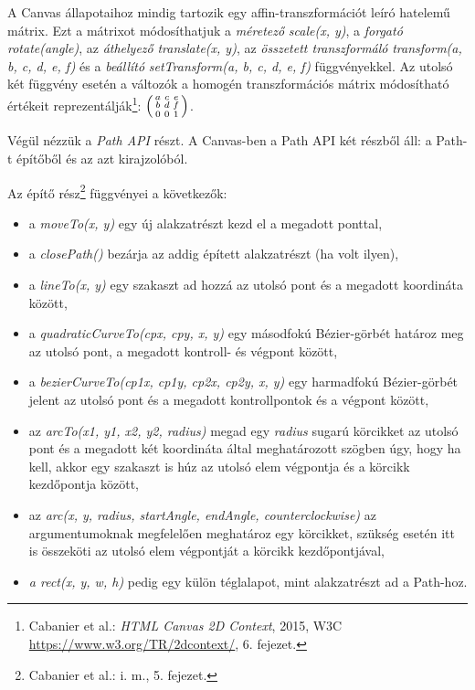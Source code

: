 \documentclass[12pt]{report}
\theoremstyle{definition}
\newcommand{\func}[1]{{\textsl{#1}}}
\begin{document}
A Canvas állapotaihoz mindig tartozik egy affin-transzformációt leíró hatelemű
mátrix. Ezt a mátrixot módosíthatjuk a \emph{méretező} \func{scale(x, y)}, a
\emph{forgató} \func{rotate(angle)}, az \emph{áthelyező} \func{translate(x,
y)}, az \emph{összetett transzformáló} \func{transform(a, b, c, d, e, f)} és a
\emph{beállító} \func{setTransform(a, b, c, d, e, f)} függvényekkel. Az utolsó
két függvény esetén a változók a homogén transzformációs mátrix módosítható
értékeit reprezentálják\footnote{Cabanier et al.: \emph{{HTML} Canvas {2D}
Context}, 2015, W3C\\ {\footnotesize\url{https://www.w3.org/TR/2dcontext/}}, 6.
fejezet.}: ${\Bigl(\begin{smallmatrix}a & c & e \\ b & d & f \\ 0 & 0 & 1 \\
\end{smallmatrix}\Bigr)}$.

Végül nézzük a \emph{Path API} részt. A Canvas-ben a Path API két részből áll:
a Path-t építőből és az azt kirajzolóból.

Az építő rész\footnote{Cabanier et al.: i. m., 5. fejezet.} függvényei a
következők:
\begin{itemize}
  \item a \func{moveTo(x, y)} egy új alakzatrészt kezd el a megadott ponttal,
  \item a \func{closePath()} bezárja az addig épített alakzatrészt (ha volt
  ilyen),
  \item a \func{lineTo(x, y)} egy szakaszt ad hozzá az utolsó pont és a
  megadott koordináta között,
  \item a \func{quadraticCurveTo(cpx, cpy, x, y)} egy másodfokú Bézier-görbét
  határoz meg az utolsó pont, a megadott kontroll- és végpont között,
  \item a \func{bezierCurveTo(cp1x, cp1y, cp2x, cp2y, x, y)} egy harmadfokú
  Bézier-görbét jelent az utolsó pont és a megadott kontrollpontok és a végpont
  között,
  \item az \func{arcTo(x1, y1, x2, y2, radius)} megad egy \func{radius} sugarú
  körcikket az utolsó pont és a megadott két koordináta által meghatározott
  szögben úgy, hogy ha kell, akkor egy szakaszt is húz az utolsó elem végpontja
  és a körcikk kezdőpontja között,
  \item az \func{arc(x, y, radius, startAngle, endAngle, counterclockwise)} az
  argumentumoknak megfelelően meghatároz egy körcikket, szükség esetén itt is
  összeköti az utolsó elem végpontját a körcikk kezdőpontjával,
  \item \func{a rect(x, y, w, h)} pedig egy külön téglalapot, mint alakzatrészt
  ad a Path-hoz.
\end{itemize}
\end{document}
